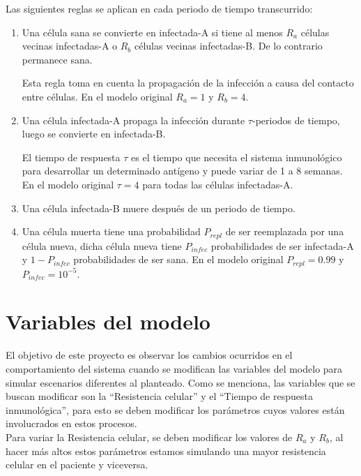 \documentclass[12pt,letterpaper,oneside]{report}
\begin{document}
	\newpage
	Las siguientes reglas se aplican en cada periodo de tiempo transcurrido:
	\begin{enumerate}
		\item Una célula sana se convierte en infectada-A si tiene al menos $R_a$ células vecinas infectadas-A o $R_b$ células vecinas infectadas-B. De lo contrario permanece sana.

		Esta regla toma en cuenta la propagación de la infección a causa del contacto entre células. En el modelo original $R_a = 1$ y $R_b = 4$.\\

		\item Una célula infectada-A propaga la infección durante $\tau$-periodos de tiempo, luego se convierte en infectada-B.

		El tiempo de respuesta $\tau$ es el tiempo que necesita el sistema inmunológico para desarrollar un determinado antígeno y puede variar de 1 a 8 semanas. En el modelo original $\tau = 4$ para todas las células infectadas-A.\\

		\item Una célula infectada-B muere después de un periodo de tiempo.\\
		\item Una célula muerta tiene una probabilidad $P_{repl}$ de ser reemplazada por una célula nueva, dicha célula nueva tiene $P_{infec}$ probabilidades de ser infectada-A y $1 - P_{infec}$ probabilidades de ser sana. En el modelo original $P_{repl} = 0.99$ y $P_{infec} = 10^{-5}$.
	\end{enumerate}

	\section{Variables del modelo} %
	\label{sec:variables_del_modelo}
	El objetivo de este proyecto es observar los cambios ocurridos en el comportamiento del sistema cuando se modifican las variables del modelo para simular escenarios diferentes al planteado. Como se menciona, las variables que se buscan modificar son la ``Resistencia celular'' y el ``Tiempo de respuesta inmunológica'', para esto se deben modificar los parámetros cuyos valores están involucrados en estos procesos.\\

	Para variar la Resistencia celular, se deben modificar los valores de $R_a$ y $R_b$, al hacer más altos estos parámetros estamos simulando una mayor resistencia celular en el paciente y viceversa.\\
\end{document}
